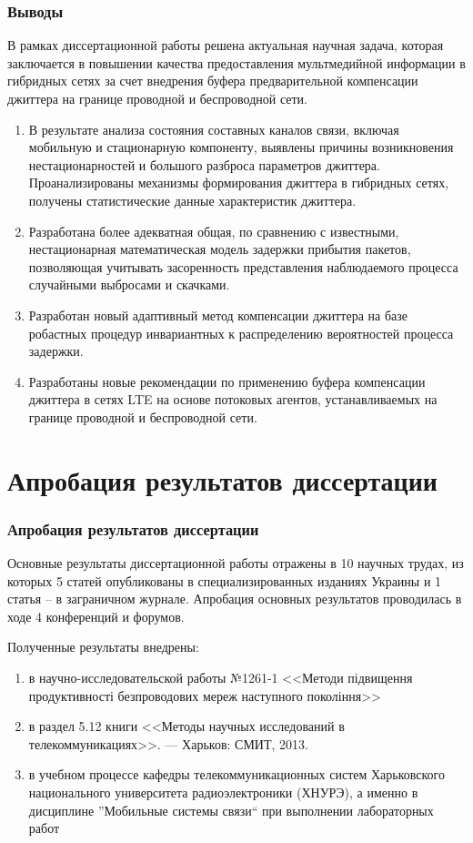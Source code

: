 \documentclass[10pt,pdf,hyperref={unicode}]{beamer}
\begin{document}
\begin{frame}
\frametitle{Выводы}



{\small

В рамках диссертационной работы решена актуальная научная задача, которая заключается в повышении качества предоставления мультмедийной информации в гибридных сетях за счет внедрения буфера предварительной компенсации джиттера на границе проводной и беспроводной сети.
}

\begin{footnotesize}
\begin{enumerate}
  \item В результате анализа состояния составных каналов связи, включая мобильную и стационарную компоненту, выявлены причины возникновения нестационарностей и большого разброса параметров джиттера.
  Проанализированы механизмы формирования джиттера в гибридных сетях, получены статистические данные характеристик джиттера.
  \item Разработана более адекватная общая, по сравнению с известными, нестационарная математическая модель задержки прибытия пакетов,
  позволяющая учитывать засоренность представления наблюдаемого процесса случайными выбросами и скачками.
  \item 
  Разработан новый адаптивный метод компенсации джиттера на базе робастных процедур инвариантных к распределению вероятностей процесса задержки.
  \item 
  Разработаны новые рекомендации по применению буфера компенсации джиттера в сетях LTE на основе потоковых агентов, устанавливаемых на границе проводной и беспроводной сети.
\end{enumerate}
\end{footnotesize}


\end{frame}


\section{Апробация результатов диссертации}

\begin{frame}
\frametitle{Апробация результатов диссертации}
Основные результаты диссертационной работы отражены в 10 научных трудах, из которых  5  статей опубликованы в специализированных изданиях Украины и 1 статья – в заграничном журнале.
Апробация основных результатов проводилась в ходе 4 конференций и форумов.

Полученные результаты внедрены: 
\begin{enumerate}
\item в научно-исследовательской работы №1261-1 <<Методи підвищення продуктивності безпроводових мереж наступного покоління>>
\item в раздел 5.12 книги <<Методы научных исследований в телекоммуникациях>>. --- Харьков: СМИТ, 2013.
\item в учебном процессе кафедры телекоммуникационных систем Харьковского национального университета радиоэлектроники (ХНУРЭ), а именно в дисциплине ''Мобильные системы связи`` при выполнении лабораторных работ
\end{enumerate}
 

\end{frame}
\end{document}
